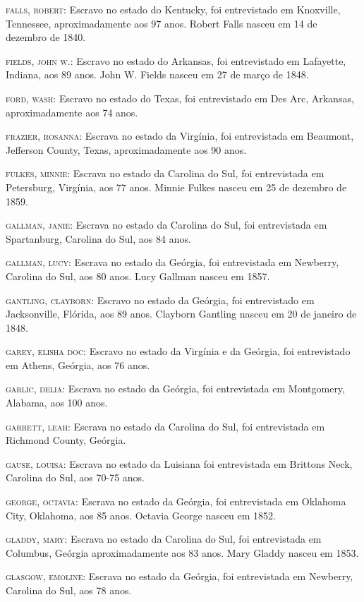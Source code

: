 \begin{Parskip}
\textsc{falls, robert:} Escravo no estado do Kentucky, foi entrevistado
em Knoxville, Tennessee, aproximadamente aos 97 anos. Robert Falls
nasceu em 14 de dezembro de 1840.

\textsc{fields, john w.:} Escravo no estado do Arkansas, foi
entrevistado em Lafayette, Indiana, aos 89 anos. John W. Fields nasceu
em 27 de março de 1848.

\textsc{ford, wash:} Escravo no estado do Texas, foi entrevistado em Des
Arc, Arkansas, aproximadamente aos 74 anos.

\textsc{frazier, rosanna:} Escrava no estado da Virgínia, foi
entrevistada em Beaumont, Jefferson County, Texas, aproximadamente aos
90 anos.

\textsc{fulkes, minnie:} Escrava no estado da Carolina do Sul, foi
entrevistada em Petersburg, Virgínia, aos 77 anos. Minnie Fulkes nasceu
em 25 de dezembro de 1859.

\textsc{gallman, janie:} Escrava no estado da Carolina do Sul, foi
entrevistada em Spartanburg, Carolina do Sul, aos 84 anos.

\textsc{gallman, lucy:} Escrava no estado da Geórgia, foi entrevistada
em Newberry, Carolina do Sul, aos 80 anos. Lucy Gallman nasceu em 1857.

\textsc{gantling, clayborn:} Escravo no estado da Geórgia, foi
entrevistado em Jacksonville, Flórida, aos 89 anos. Clayborn Gantling
nasceu em 20 de janeiro de 1848.

\textsc{garey, elisha doc:} Escravo no estado da Virgínia e da Geórgia,
foi entrevistado em Athens, Geórgia, aos 76 anos.

\textsc{garlic, delia:} Escrava no estado da Geórgia, foi entrevistada
em Montgomery, Alabama, aos 100 anos.

\textsc{garrett, leah:} Escrava no estado da Carolina do Sul, foi
entrevistada em Richmond County, Geórgia.

\textsc{gause, louisa:} Escrava no estado da Luisiana foi entrevistada
em Brittons Neck, Carolina do Sul, aos 70-75 anos.

\textsc{george, octavia:} Escrava no estado da Geórgia, foi entrevistada
em Oklahoma City, Oklahoma, aos 85 anos. Octavia George nasceu em 1852.

\textsc{gladdy, mary:} Escrava no estado da Carolina do Sul, foi
entrevistada em Columbus, Geórgia aproximadamente aos 83 anos. Mary
Gladdy nasceu em 1853.

\textsc{glasgow, emoline:} Escrava no estado da Geórgia, foi
entrevistada em Newberry, Carolina do Sul, aos 78 anos.


\end{Parskip}

